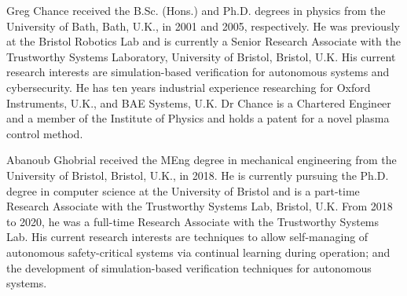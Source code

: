 \documentclass[letterpaper, 10 pt, journal, twoside]{IEEEtran}
\begin{document}
\begin{IEEEbiography}{Greg Chance}
received the B.Sc. (Hons.) and Ph.D. degrees in physics from the University of Bath, Bath, U.K., in 2001 and 2005, respectively. He was previously at the Bristol Robotics Lab and is currently a Senior Research Associate with the Trustworthy Systems Laboratory, University of Bristol, Bristol, U.K. His current research interests are simulation-based verification for autonomous systems and cybersecurity. He has ten years industrial experience researching for Oxford Instruments, U.K., and BAE Systems, U.K. Dr Chance is a Chartered Engineer and a member of the Institute of Physics and holds a patent for a novel plasma control method. 
\end{IEEEbiography}

\begin{IEEEbiography}{Abanoub Ghobrial}
received the MEng degree in mechanical engineering from the University of Bristol, Bristol,  U.K., in 2018. He is currently pursuing the Ph.D. degree in computer science at the University of Bristol and is a part-time Research Associate with the Trustworthy Systems Lab, Bristol,  U.K. From 2018 to 2020, he was a full-time Research Associate with the Trustworthy Systems Lab. His current research interests are techniques to allow self-managing of autonomous safety-critical systems via continual learning during operation; and the development of simulation-based verification techniques for autonomous systems.
\end{IEEEbiography}
\end{document}
